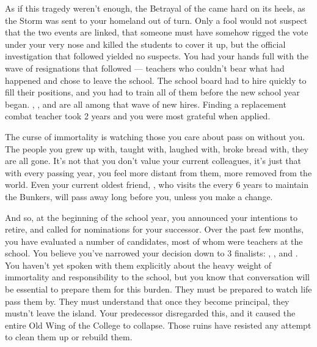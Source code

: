 \documentclass[char]{GL2020}
\begin{document}
As if this tragedy weren't enough, the Betrayal of the \pShip{} came hard on its heels, as the Storm was sent to your homeland out of turn. Only a fool would not suspect that the two events are linked, that someone must have somehow rigged the vote under your very nose and killed the students to cover it up, but the official investigation that followed yielded no suspects. You had your hands full with the wave of resignations that followed — teachers who couldn't bear what had happened and chose to leave the school. The school board had to hire quickly to fill their positions, and you had to train all of them before the new school year began. \cPrince{\intro}, \cChupInventor{\intro}, and \cChupSecond{\intro} are all among that wave of new hires. Finding a replacement combat teacher took 2 years and you were most grateful when \cInterpol{\intro} applied.

The curse of immortality is watching those you care about pass on without you. The people you grew up with, taught with, laughed with, broke bread with, they are all gone. It's not that you don't value your current colleagues, it's just that with every passing year, you feel more distant from them, more removed from the world. Even your current oldest friend, \cBunker{\intro}, who visits the \pSc{} every 6 years to maintain the Bunkers, will pass away long before you, unless you make a change. 

And so, at the beginning of the school year, you announced your intentions to retire, and called for nominations for your successor. Over the past few months, you have evaluated a number of candidates, most of whom were teachers at the school. You believe you've narrowed your decision down to 3 finalists: \cMusic{\full}, \cBeetle{\intro}, and \cChupSecond{\full}. You haven't yet spoken with them explicitly about the heavy weight of immortality and responsibility to the school, but you know that conversation will be essential to prepare them for this burden. They must be prepared to watch life pass them by. They must understand that once they become principal, they mustn't leave the island. Your predecessor disregarded this, and it caused the entire Old Wing of the College to collapse. Those ruins have resisted any attempt to clean them up or rebuild them.
\end{document}
